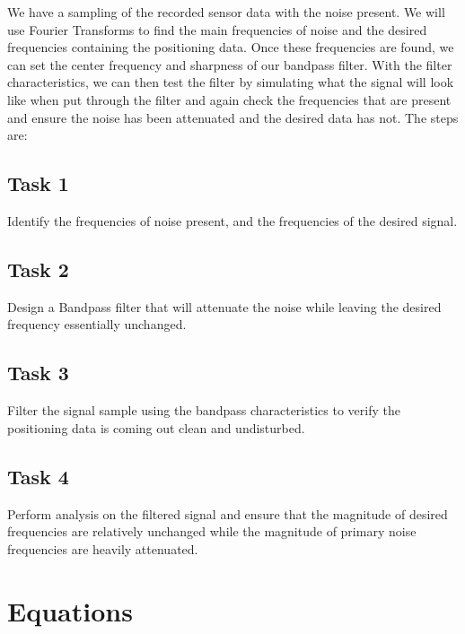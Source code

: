 \documentclass[12pt]{report}
\begin{document}
We have a sampling of the recorded sensor data with the noise present.
We will use Fourier Transforms to find the main frequencies of noise and
the desired frequencies containing the positioning data. Once these
frequencies are found, we can set the center frequency and sharpness of
our bandpass filter. With the filter characteristics, we can then test
the filter by simulating what the signal will look like when put through
the filter and again check the frequencies that are present and ensure
the noise has been attenuated and the desired data has not. The steps
are:

\hypertarget{task-1}{%
\section{Task 1}\label{task-1}}

Identify the frequencies of noise present, and the frequencies of the
desired signal.

\hypertarget{task-2}{%
\section{Task 2}\label{task-2}}

Design a Bandpass filter that will attenuate the noise while leaving the
desired frequency essentially unchanged.

\hypertarget{task-3}{%
\section{Task 3}\label{task-3}}

Filter the signal sample using the bandpass characteristics to verify the positioning data is coming out clean and undisturbed.

\hypertarget{task-4}{%
\section{Task 4}\label{task-4}}

Perform analysis on the filtered signal and ensure that the magnitude of
desired frequencies are relatively unchanged while the magnitude of
primary noise frequencies are heavily attenuated.

\pagebreak

\hypertarget{equations}{%
\chapter{Equations}\label{equations}}
\end{document}
